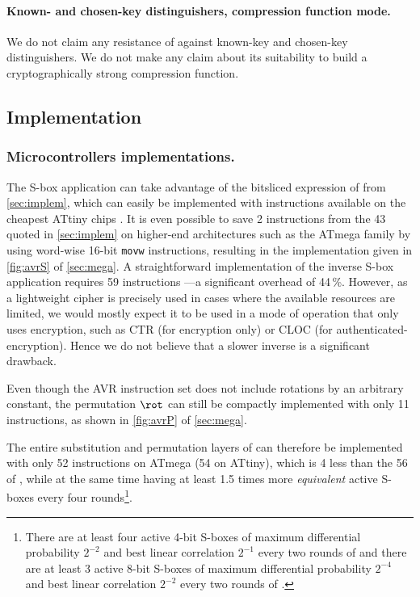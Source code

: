 \paragraph{Known- and chosen-key distinguishers, compression function mode.}
We do not claim any resistance of \fly against known-key and chosen-key distinguishers. We do not make any claim about its suitability
to build a cryptographically strong compression function.

\subsection{Implementation}
\label{sec:flyimplem}


\subsubsection{Microcontrollers implementations.}
The S-box application can take advantage of the bitsliced expression of \littlunOne from \autoref{sec:implem}, which can easily be implemented with instructions available on the cheapest ATtiny chips \cite{ATtiny}. It is even possible to save 2 instructions from
the 43 quoted in \autoref{sec:implem} on higher-end architectures such as the ATmega family \cite{ATmega} by using word-wise 16-bit \texttt{movw} instructions,
resulting in the implementation given in \autoref{fig:avrS} of \autoref{sec:mega}. A straightforward implementation of the inverse S-box application requires 59 instructions ---a significant overhead of 44\,\%.
However, as a lightweight cipher is precisely used in cases where the available resources are limited, we would mostly expect it to be used in a mode of operation that only uses encryption,
such as \eg \textsf{CTR} (for encryption only) or \textsf{CLOC} \cite{cloc} (for authenticated-encryption). Hence we do not believe that a slower inverse is a significant drawback.

Even though the AVR instruction set does not include rotations by an arbitrary constant, the permutation $\rot$ can still
be compactly implemented with only 11 instructions, as shown in \autoref{fig:avrP} of \autoref{sec:mega}.

The entire substitution and permutation layers of \fly can therefore be implemented with only 52 instructions on ATmega (54 on ATtiny), which is 4 less than the 56 of \pride \cite{pride},
while at the same time having at least 1.5 times more \emph{equivalent} active S-boxes every four rounds\footnote{There are at least four active 4-bit S-boxes of maximum differential probability $2^{-2}$ and
best linear correlation $2^{-1}$ every two rounds of \pride and there are at least 3 active 8-bit S-boxes of maximum differential probability $2^{-4}$ and best linear correlation $2^{-2}$ every
two rounds of \fly.}.


